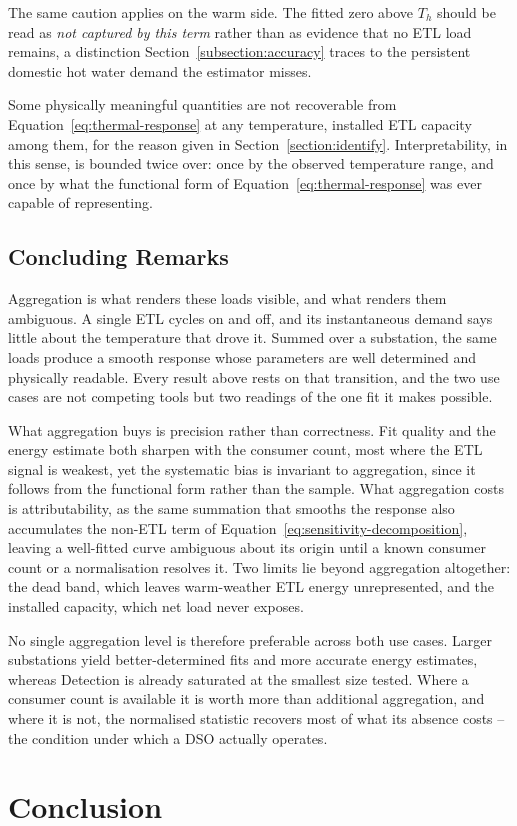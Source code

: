 \documentclass[9pt,journal,a4]{IEEEtran}
\begin{document}
The same caution applies on the warm side. The fitted zero above $T_h$ should be read as \emph{not captured by this term} rather than as evidence that no ETL load remains, a distinction Section~\ref{subsection:accuracy} traces to the persistent domestic hot water demand the estimator misses.

Some physically meaningful quantities are not recoverable from Equation~\eqref{eq:thermal-response} at any temperature, installed ETL capacity among them, for the reason given in Section~\ref{section:identify}. Interpretability, in this sense, is bounded twice over: once by the observed temperature range, and once by what the functional form of Equation~\eqref{eq:thermal-response} was ever capable of representing.


\subsection{Concluding Remarks}

Aggregation is what renders these loads visible, and what renders them ambiguous. A single ETL cycles on and off, and its instantaneous demand says little about the temperature that drove it. Summed over a substation, the same loads produce a smooth response whose parameters are well determined and physically readable. Every result above rests on that transition, and the two use cases are not competing tools but two readings of the one fit it makes possible.

What aggregation buys is precision rather than correctness. Fit quality and the energy estimate both sharpen with the consumer count, most where the ETL signal is weakest, yet the systematic bias is invariant to aggregation, since it follows from the functional form rather than the sample. What aggregation costs is attributability, as the same summation that smooths the response also accumulates the non-ETL term of Equation~\eqref{eq:sensitivity-decomposition}, leaving a well-fitted curve ambiguous about its origin until a known consumer count or a normalisation resolves it. Two limits lie beyond aggregation altogether: the dead band, which leaves warm-weather ETL energy unrepresented, and the installed capacity, which net load never exposes.

No single aggregation level is therefore preferable across both use cases. Larger substations yield better-determined fits and more accurate energy estimates, whereas Detection is already saturated at the smallest size tested. Where a consumer count is available it is worth more than additional aggregation, and where it is not, the normalised statistic recovers most of what its absence costs -- the condition under which a DSO actually operates.


\section{Conclusion}
\label{section:conclusion}


% 
% 
\end{document}
